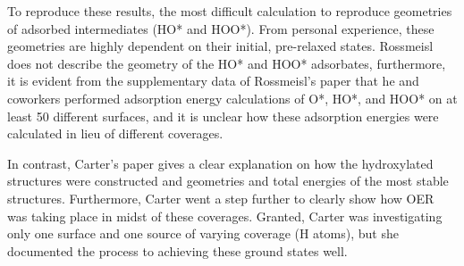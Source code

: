 \documentclass[11pt]{article}
\begin{document}
  To reproduce these results, the most difficult calculation to
  reproduce geometries of adsorbed intermediates (HO* and HOO*).
  From personal experience, these geometries are 
  highly dependent on their initial, pre-relaxed states.
  Rossmeisl does not describe the geometry of the HO* and HOO*
  adsorbates, furthermore, it is evident from the supplementary data of
  Rossmeisl's paper that he and coworkers performed adsorption energy
  calculations of O*, HO*, and HOO* on at least 50 different
  surfaces, and it is unclear how these adsorption energies were
  calculated in lieu of different coverages. 

  In contrast, Carter's paper gives a clear explanation on how the
  hydroxylated structures were constructed and geometries and total
  energies of the most stable structures.
  Furthermore, Carter went a step further to clearly show how OER was
  taking place in midst of these coverages.
  Granted, Carter was investigating only one surface and one source of
  varying coverage (H atoms), but she documented the process to
  achieving these ground states well.
\end{document}
